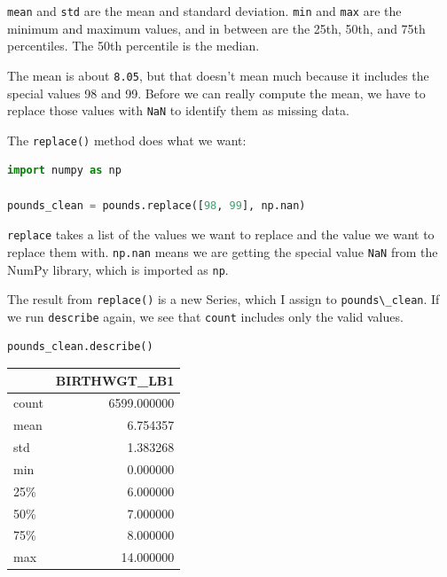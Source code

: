 \passthrough{\lstinline!mean!} and \passthrough{\lstinline!std!} are the
mean and standard deviation. \passthrough{\lstinline!min!} and
\passthrough{\lstinline!max!} are the minimum and maximum values, and in
between are the 25th, 50th, and 75th percentiles. The 50th percentile is
the median.

The mean is about \passthrough{\lstinline!8.05!}, but that doesn't mean
much because it includes the special values 98 and 99. Before we can
really compute the mean, we have to replace those values with
\passthrough{\lstinline!NaN!} to identify them as missing data.

The \passthrough{\lstinline!replace()!} method does what we want:

\begin{lstlisting}[language=Python]
import numpy as np

pounds_clean = pounds.replace([98, 99], np.nan)
\end{lstlisting}

\passthrough{\lstinline!replace!} takes a list of the values we want to
replace and the value we want to replace them with.
\passthrough{\lstinline!np.nan!} means we are getting the special value
\passthrough{\lstinline!NaN!} from the NumPy library, which is imported
as \passthrough{\lstinline!np!}.

The result from \passthrough{\lstinline!replace()!} is a new Series,
which I assign to \passthrough{\lstinline!pounds\_clean!}. If we run
\passthrough{\lstinline!describe!} again, we see that
\passthrough{\lstinline!count!} includes only the valid values.

\begin{lstlisting}[language=Python]
pounds_clean.describe()
\end{lstlisting}

\begin{tabular}{lr}
\toprule
{} &  BIRTHWGT\_LB1 \\
\midrule
count &   6599.000000 \\
mean  &      6.754357 \\
std   &      1.383268 \\
min   &      0.000000 \\
25\%   &      6.000000 \\
50\%   &      7.000000 \\
75\%   &      8.000000 \\
max   &     14.000000 \\
\bottomrule
\end{tabular}

